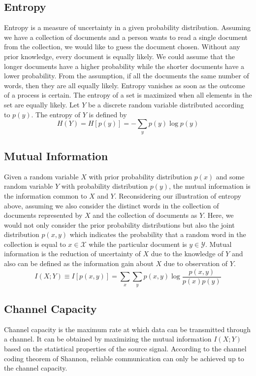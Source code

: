 \subsection{Entropy}
Entropy is a measure of uncertainty in a given probability distribution. Assuming we have a collection of documents and a person wants to read a single document from the collection, we would like to guess the document chosen. Without any prior knowledge, every document is equally likely. We could assume that the longer documents have a higher probability while the shorter documents have a lower probability. From the assumption, if all the documents the same number of words, then they are all equally likely. Entropy vanishes as soon as the outcome of a process is certain. The entropy of a set is maximized when all elements in the set are equally likely.
\newline
Let $Y $ be a discrete random variable distributed according to $p(y)$. The entropy of $Y$ is defined by 
\begin{equation}
H(Y) = H[p(y)] = -\sum_y p(y) \log p(y)
\end{equation}

\subsection{Mutual Information}
Given a random variable $X$ with prior probability distribution $p(x)$ and some random variable $Y$ with probability distribution $p(y)$, the mutual information is the information common to $X$ and $Y$. Reconsidering our illustration of entropy above, assuming we also consider the distinct words in the collection of documents represented by $X$ and the collection of documents as $Y$. Here, we would not only consider the prior probability distributions but also the joint distribution $p(x, y)$ which indicates the probability that a random word in the collection is equal to $x \in  \mathcal{X}$ while the particular document is  $y \in  \mathcal{Y}$.
\newline
Mutual information is the reduction of uncertainty of $X$ due to the knowledge of $Y$ and also can be defined as the information gain about $X$ due to observation of $Y$.
\begin{equation}
I(X;Y) \equiv I[p(x, y)] = \sum_x \sum_y p(x, y) \log \frac{p(x, y)}{p(x)p(y)}
\end{equation}

\subsection{Channel Capacity}
Channel capacity is the maximum rate at which data can be transmitted through a channel. It can be obtained by maximizing the mutual information $I(X;Y)$  based on the statistical properties of the source signal.  According to the channel coding theorem of Shannon, reliable communication can only be achieved up to the channel capacity.


